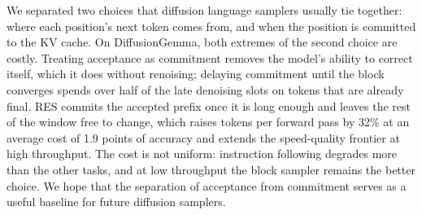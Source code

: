 We separated two choices that diffusion language samplers usually tie together: where each position's next token comes from, and when the position is committed to the KV cache.
On DiffusionGemma, both extremes of the second choice are costly.
Treating acceptance as commitment removes the model's ability to correct itself, which it does without renoising; delaying commitment until the block converges spends over half of the late denoising slots on tokens that are already final.
RES commits the accepted prefix once it is long enough and leaves the rest of the window free to change, which raises tokens per forward pass by 32\% at an average cost of 1.9 points of accuracy and extends the speed-quality frontier at high throughput.
The cost is not uniform: instruction following degrades more than the other tasks, and at low throughput the block sampler remains the better choice.
We hope that the separation of acceptance from commitment serves as a useful baseline for future diffusion samplers.
